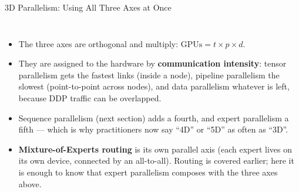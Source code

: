 \begin{frame}{3D Parallelism: Using All Three Axes at Once}
  \begin{columns}[T,onlytextwidth]
      \centering
      \vspace{0.6em}
      \begin{itemize}\footnotesize\itemsep0.3em
        \item[\textcolor{red}{$\blacktriangleright$}] The three axes are orthogonal and multiply:
          $\text{GPUs} = t \times p \times d$.
        \item[\textcolor{red}{$\blacktriangleright$}] They are assigned to the hardware by \textbf{communication intensity}: tensor parallelism gets the fastest links (inside a node), pipeline parallelism the slowest (point-to-point across nodes), and data parallelism whatever is left, because DDP traffic can be overlapped.
        \item[\textcolor{red}{$\blacktriangleright$}] Sequence parallelism (next section) adds a fourth, and expert parallelism a fifth --- which is why practitioners now say ``4D'' or ``5D'' as often as ``3D''.
        \item[\textcolor{red}{$\blacktriangleright$}] \textbf{Mixture-of-Experts routing} is its own parallel axis (each expert lives on its own device, connected by an all-to-all). Routing is covered earlier; here it is enough to know that expert parallelism composes with the three axes above.
      \end{itemize}
  \end{columns}
\end{frame}

